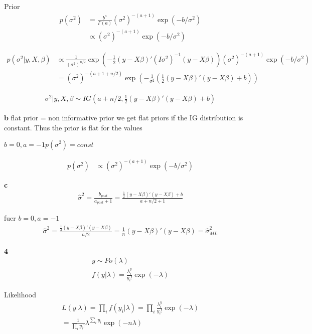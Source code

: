 \documentclass{article}
\begin{document}
Prior
\begin{align*}
p(\sigma^2)  &= \frac{b^a}{\Gamma(a)} (\sigma^2)^{-(a+1)} \exp(-b/\sigma^2)  \\
&\propto  (\sigma^2)^{-(a+1)} \exp(-b/\sigma^2)  
\end{align*}

\begin{align*}
p(\sigma^2 | y,X,\beta) &\propto \frac{1}{ (\sigma^2)^{n/2} } 
\exp(-\frac{1}{2}(y-X\beta)' (I \sigma^2)^{-1} (y-X\beta))  (\sigma^2)^{-(a+1)} \exp(-b/\sigma^2)  \\
&= (\sigma^2)^{-(a+1+n/2)} \exp(-\frac{1}{\sigma^2}(\frac{1}{2}(y-X\beta)' (y-X\beta) + b)) 
\end{align*}

\begin{align*}
\sigma^2 | y,X,\beta \sim IG(a+n/2, \frac{1}{2}(y-X\beta)' (y-X\beta) + b)
\end{align*}

\textbf{b}
flat prior = non informative prior
we get flat priors if the IG distribution is constant. Thus the prior is flat for the values

$b=0, a=-1 p(\sigma^2) = const$

\begin{align*}
p(\sigma^2)  &\propto  (\sigma^2)^{-(a+1)} \exp(-b/\sigma^2)  
\end{align*}

\textbf{c}
\begin{align*}
\hat{\sigma}^2 = \frac{b_{post}}{a_{post}+1} = \frac{\frac{1}{2}(y-X\beta)' (y-X\beta) + b}{a+n/2+1}
\end{align*}

fuer $b=0, a=-1$ 
\begin{align*}
\hat{\sigma}^2 = \frac{\frac{1}{2}(y-X\beta)' (y-X\beta)}{n/2} = \frac{1}{n} (y-X\beta)' (y-X\beta) = \hat{\sigma}_{ML}^2
\end{align*}

\textbf{4}
\begin{align*}
y \sim Po(\lambda) \\
f(y|\lambda) = \frac{\lambda^y_i}{y_i!}\exp(-\lambda)
\end{align*}

Likelihood
\begin{align*}
L(y|\lambda) = \prod_i f(y_i|\lambda) = \prod_i \frac{\lambda^y_i}{y_i!}\exp(-\lambda) \\
=  \frac{1}{\prod_i y_i!} \lambda^{\sum_i y_i} \exp(-n \lambda)
\end{align*}
\end{document}
